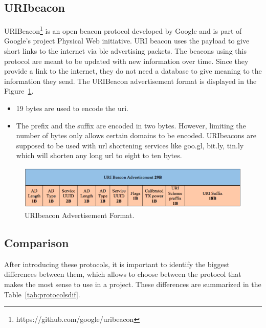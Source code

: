 \subsection{URIbeacon}
\label{subsection:uribeacon}
URIBeacon\footnote{https://github.com/google/uribeacon} is an open beacon protocol developed by Google and is part of Google’s project Physical Web initiative. URI beacon uses the payload to give short links to the internet via \gls{ble} advertising packets. The beacons using this protocol are meant to be updated with new information over time. Since they provide a link to the internet, they do not need a database to give meaning to the information they send. The URIBeacon advertisement format is displayed in the Figure~\ref{fig:uribeaconadv}.

\begin{itemize}
\item 19 bytes are used to encode the \gls{uri}.
\item The prefix and the suffix are encoded in two bytes. However, limiting the number of bytes only allows certain domains to be encoded. URIbeacons are supposed to be used with \gls{url} shortening services like goo.gl, bit.ly, tin.ly which will shorten any long \gls{url} to eight to ten bytes.
\end{itemize}
 

\begin{figure}[!htb]
  \centering
  \includegraphics[width=1\textwidth]{Figures/uribeacon_v2.png}
  \caption[URIbeacon Advertisement Format]{URIbeacon Advertisement Format.}
  \label{fig:uribeaconadv}
\end{figure}

\subsection{Comparison}
\label{subsection:comparison}

After introducing these protocols, it is important to identify the biggest differences between them, which allows to choose between the protocol that makes the most sense to use in a project. These differences are summarized in the Table~\ref{tab:protocolsdif}.

